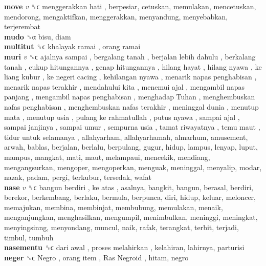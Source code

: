 \textbf{move} \emph{v}  ␝ϲ   menggerakkan hati , berpesiar, cetuskan, memulakan, mencetuskan, mendorong, mengaktifkan, menggerakkan, menyandung, menyebabkan, terjerembat  \\
\textbf{mudo} ␝α  bisu, diam  \\
\textbf{multitut} ␝ϲ   khalayak ramai ,  orang ramai   \\
\textbf{muri} \emph{v}  ␝ϲ   ajalnya sampai ,  bergalang tanah ,  berjalan lebih dahulu ,  berkalang tanah ,  cukup hitungannya ,  genap hitungannya ,  hilang hayat ,  hilang nyawa ,  ke liang kubur ,  ke negeri cacing ,  kehilangan nyawa ,  menarik napas penghabisan ,  menarik napas terakhir ,  mendahului kita ,  menemui ajal ,  mengambil napas panjang ,  mengambil napas penghabisan ,  menghadap Tuhan ,  menghembuskan nafas penghabisan ,  menghembuskan nafas terakhir ,  meninggal dunia ,  menutup mata ,  menutup usia ,  pulang ke rahmatullah ,  putus nyawa ,  sampai ajal ,  sampai janjinya ,  sampai umur ,  sempurna usia ,  tamat riwayatnya ,  temu maut ,  tidur untuk selamanya , allahyarham, allahyarhamah, almarhum, amusement, arwah, bablas, berjalan, berlalu, berpulang, gugur, hidup, lampus, lenyap, luput, mampus, mangkat, mati, maut, melampaui, mencekik, mendiang, mengangsurkan, mengoper, mengoperkan, menguak, meninggal, menyalip, modar, nazak, padam, pergi, terkubur, tersedak, wafat  \\
\textbf{nase} \emph{v}  ␝ϲ   bangun berdiri ,  ke atas , asalnya, bangkit, bangun, berasal, berdiri, berekor, berkembang, berlaku, bermula, berpunca, diri, hidup, keluar, meloncer, memajukan, membina, membinjat, membubung, memulakan, menaik, menganjungkan, menghasilkan, mengumpil, menimbulkan, meninggi, meningkat, menyingsinng, menyondang, muncul, naik, rafak, terangkat, terbit, terjadi, timbul, tumbuh  \\
\textbf{nasementu} ␝ϲ   dari awal ,  proses melahirkan , kelahiran, lahirnya, parturisi  \\
\textbf{neger} ␝ϲ   Negro ,  orang item ,  Ras Negroid , hitam, negro  \\
